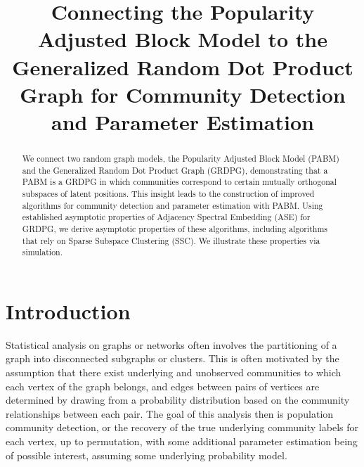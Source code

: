 \documentclass[12pt]{article}
\title{Connecting the Popularity Adjusted Block Model to the Generalized Random
Dot Product Graph for Community Detection and Parameter Estimation}
\author{}
\date{\vspace{-2.5em}}
\def\spacingset#1{\renewcommand{\baselinestretch}%
{#1}\small\normalsize} \spacingset{1}
\providecommand{\tightlist}{%
  \setlength{\itemsep}{0pt}\setlength{\parskip}{0pt}}
\begin{document}
\maketitle
\begin{abstract}
We connect two random graph models, the Popularity Adjusted Block Model
(PABM) and the Generalized Random Dot Product Graph (GRDPG),
demonstrating that a PABM is a GRDPG in which communities correspond to
certain mutually orthogonal subspaces of latent positions. This insight
leads to the construction of improved algorithms for community detection
and parameter estimation with PABM. Using established asymptotic
properties of Adjacency Spectral Embedding (ASE) for GRDPG, we derive
asymptotic properties of these algorithms, including algorithms that
rely on Sparse Subspace Clustering (SSC). We illustrate these properties
via simulation.
\end{abstract}

\providecommand{\tightlist}{%
  \setlength{\itemsep}{0pt}\setlength{\parskip}{0pt}}
\newcommand{\diag}{\mathrm{diag}}
\newcommand{\tr}{\mathrm{Tr}}
\newcommand{\blockdiag}{\mathrm{blockdiag}}
\newcommand{\indep}{\stackrel{\mathrm{indep}}{\sim}}
\newcommand{\iid}{\stackrel{\mathrm{iid}}{\sim}}
\newcommand{\Bernoulli}{\mathrm{Bernoulli}}
\newcommand{\Betadist}{\mathrm{Beta}}
\newcommand{\BG}{\mathrm{BernoulliGraph}}
\newcommand{\PABM}{\mathrm{PABM}}
\newcommand{\RDPG}{\mathrm{RDPG}}
\newcommand{\GRDPG}{\mathrm{GRDPG}}
\newcommand{\Multinomial}{\mathrm{Multinomial}}
\newtheorem{theorem}{Theorem}
\newtheorem{lemma}{Lemma}
\newtheorem{proposition}{Proposition}
\theoremstyle{remark}
\newtheorem*{remark}{Remark}
\theoremstyle{definition}
\newtheorem{definition}{Definition}
\newtheorem*{example}{Example}
\newpage
\spacingset{1.5} %

\hypertarget{introduction}{%
\section{Introduction}\label{introduction}}

Statistical analysis on graphs or networks often involves the
partitioning of a graph into disconnected subgraphs or clusters. This is
often motivated by the assumption that there exist underlying and
unobserved communities to which each vertex of the graph belongs, and
edges between pairs of vertices are determined by drawing from a
probability distribution based on the community relationships between
each pair. The goal of this analysis then is population community
detection, or the recovery of the true underlying community labels for
each vertex, up to permutation, with some additional parameter
estimation being of possible interest, assuming some underlying
probability model. 
\end{document}
